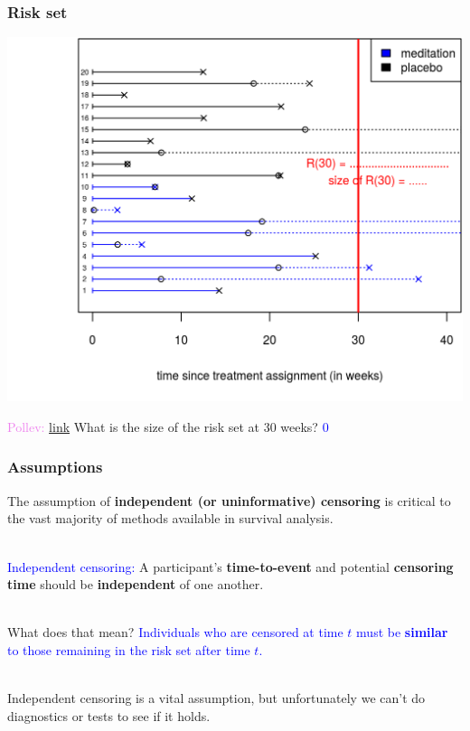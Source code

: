 \documentclass[10pt,t]{beamer}
\begin{document}
\begin{frame}
\frametitle{Risk set}
\begin{center}
\includegraphics[height=0.8\textheight]{figs/risk_set_movie_6.png}
\end{center}

\textcolor{violet}{Pollev: \href{https://PollEv.com/free_text_polls/DTZO81Z0Lrl65SYGvMo6p/respond}{link}} What is the size of the risk set at 30 weeks?  \pause\textcolor{blue}{0}
\end{frame}

\begin{frame}
\frametitle{Assumptions}
The assumption of \textbf{independent (or uninformative) censoring} is critical to the vast majority of methods available in survival analysis.
\\ ~\ 

\textcolor{blue}{Independent censoring:} A participant's \textbf{time-to-event} and potential \textbf{censoring time} should be \textbf{independent} of one another.  
\\ ~\ 

What does that mean?   \textcolor{blue}{Individuals who are censored at time $t$ must be \textbf{similar} to those remaining in the risk set after time $t$.}  
\\ ~\ 

Independent censoring is a vital assumption, but unfortunately we can't do diagnostics or tests to see if it holds. 

\end{frame}
\end{document}
